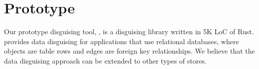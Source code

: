 \section{Prototype}
\label{sec:proto}
%
Our prototype disguising tool, \sys, is a disguising library written in 5K LoC of Rust.
%
%
\sys provides data disguising for applications that use relational databases, where
objects are table rows and edges are foreign key relationships.
%
We believe that the data disguising approach can be extended to other types of stores.
%
